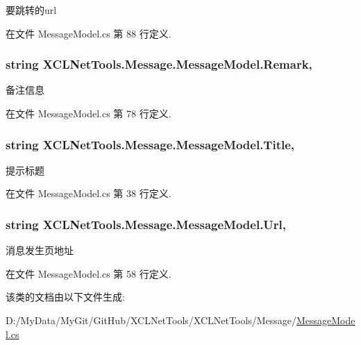 要跳转的url 



在文件 Message\-Model.\-cs 第 88 行定义.

\hypertarget{class_x_c_l_net_tools_1_1_message_1_1_message_model_a9cbdcd7db26f62ea746c835e82e3dcf0}{
\subsubsection[{Remark}]{\setlength{\rightskip}{0pt plus 5cm}string X\-C\-L\-Net\-Tools.\-Message.\-Message\-Model.\-Remark\hspace{0.3cm}{\ttfamily [get]}, {\ttfamily [set]}}}\label{class_x_c_l_net_tools_1_1_message_1_1_message_model_a9cbdcd7db26f62ea746c835e82e3dcf0}


备注信息 



在文件 Message\-Model.\-cs 第 78 行定义.

\hypertarget{class_x_c_l_net_tools_1_1_message_1_1_message_model_a580b7fe7f6918b6803a7e7b8e656905b}{
\subsubsection[{Title}]{\setlength{\rightskip}{0pt plus 5cm}string X\-C\-L\-Net\-Tools.\-Message.\-Message\-Model.\-Title\hspace{0.3cm}{\ttfamily [get]}, {\ttfamily [set]}}}\label{class_x_c_l_net_tools_1_1_message_1_1_message_model_a580b7fe7f6918b6803a7e7b8e656905b}


提示标题 



在文件 Message\-Model.\-cs 第 38 行定义.

\hypertarget{class_x_c_l_net_tools_1_1_message_1_1_message_model_a50c6a9523a8b8dc168360318f7be8574}{
\subsubsection[{Url}]{\setlength{\rightskip}{0pt plus 5cm}string X\-C\-L\-Net\-Tools.\-Message.\-Message\-Model.\-Url\hspace{0.3cm}{\ttfamily [get]}, {\ttfamily [set]}}}\label{class_x_c_l_net_tools_1_1_message_1_1_message_model_a50c6a9523a8b8dc168360318f7be8574}


消息发生页地址 



在文件 Message\-Model.\-cs 第 58 行定义.



该类的文档由以下文件生成\-:\begin{DoxyCompactItemize}
\item 
D\-:/\-My\-Data/\-My\-Git/\-Git\-Hub/\-X\-C\-L\-Net\-Tools/\-X\-C\-L\-Net\-Tools/\-Message/\hyperlink{_message_model_8cs}{Message\-Model.\-cs}\end{DoxyCompactItemize}
